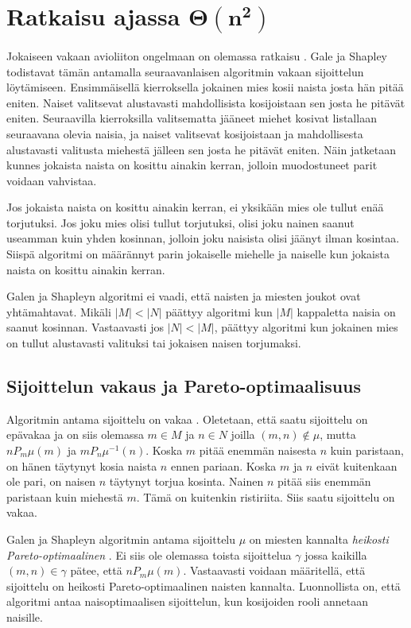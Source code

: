 \documentclass[gradu, twoside]{tktltiki}
\begin{document}
\section{Ratkaisu ajassa $\boldsymbol{\Theta(n^2)}$}

Jokaiseen vakaan avioliiton ongelmaan on olemassa ratkaisu
\cite{galeshapley62}. Gale ja Shapley todistavat tämän antamalla
seuraavanlaisen algoritmin vakaan sijoittelun löytämiseen.
Ensimmäisellä kierroksella jokainen mies kosii naista josta hän pitää
eniten. Naiset valitsevat alustavasti mahdollisista kosijoistaan sen
josta he pitävät eniten. Seuraavilla kierroksilla valitsematta jääneet
miehet kosivat listallaan seuraavana olevia naisia, ja naiset
valitsevat kosijoistaan ja mahdollisesta alustavasti valitusta
miehestä jälleen sen josta he pitävät eniten. Näin jatketaan kunnes
jokaista naista on kosittu ainakin kerran, jolloin muodostuneet parit
voidaan vahvistaa.

Jos jokaista naista on kosittu ainakin kerran, ei yksikään mies ole
tullut enää torjutuksi. Jos joku mies olisi tullut torjutuksi, olisi
joku nainen saanut useamman kuin yhden kosinnan, jolloin joku naisista
olisi jäänyt ilman kosintaa. Siispä algoritmi on määrännyt parin
jokaiselle miehelle ja naiselle kun jokaista naista on kosittu ainakin
kerran.

Galen ja Shapleyn algoritmi ei vaadi, että naisten ja miesten joukot
ovat yhtämahtavat. Mikäli $|M| < |N|$ päättyy algoritmi kun $|M|$
kappaletta naisia on saanut kosinnan. Vastaavasti jos $|N| < |M|$,
päättyy algoritmi kun jokainen mies on tullut alustavasti valituksi
tai jokaisen naisen torjumaksi. \cite{galeshapley62}

\subsection{Sijoittelun vakaus ja Pareto-optimaalisuus}

Algoritmin antama sijoittelu on vakaa \cite{galeshapley62}. Oletetaan,
että saatu sijoittelu on epävakaa ja on siis olemassa $m \in M$ ja $n
\in N$ joilla $(m, n) \notin \mu$, mutta $nP_m\mu(m)$ ja
$mP_n\mu^{-1}(n)$. Koska $m$ pitää enemmän naisesta $n$ kuin
paristaan, on hänen täytynyt kosia naista $n$ ennen pariaan. Koska $m$
ja $n$ eivät kuitenkaan ole pari, on naisen $n$ täytynyt torjua
kosinta. Nainen $n$ pitää siis enemmän paristaan kuin miehestä $m$.
Tämä on kuitenkin ristiriita. Siis saatu sijoittelu on vakaa.

Galen ja Shapleyn algoritmin antama sijoittelu $\mu$ on miesten
kannalta \emph{heikosti Pareto-optimaalinen} \cite{gusfield89}. Ei
siis ole olemassa toista sijoittelua $\gamma$ jossa kaikilla $(m, n)
\in \gamma$ pätee, että $nP_m\mu(m)$. Vastaavasti voidaan määritellä,
että sijoittelu on heikosti Pareto-optimaalinen naisten kannalta.
Luonnollista on, että algoritmi antaa naisoptimaalisen sijoittelun,
kun kosijoiden rooli annetaan naisille.
\end{document}
